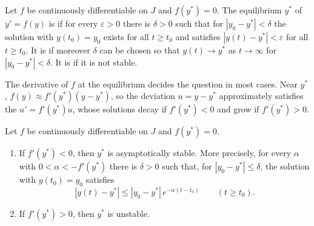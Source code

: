 \begin{definition}[Stability]
\label{def:stability}
Let $f$ be continuously differentiable on $J$ and $f(y^*)=0$. The equilibrium $y^*$ of $y'=f(y)$ is  if for every $\varepsilon>0$ there is $\delta>0$ such that for $|y_0-y^*|<\delta$ the solution with $y(t_0)=y_0$ exists for all $t\ge t_0$ and satisfies $|y(t)-y^*|<\varepsilon$ for all $t\ge t_0$. It is  if moreover $\delta$ can be chosen so that $y(t)\to y^*$ as $t\to\infty$ for $|y_0-y^*|<\delta$. It is  if it is not stable.
\end{definition}

The derivative of $f$ at the equilibrium decides the question in most cases. Near $y^*$, $f(y)\approx f'(y^*)(y-y^*)$, so the deviation $u=y-y^*$ approximately satisfies the  $u'=f'(y^*)u$, whose solutions decay if $f'(y^*)<0$ and grow if $f'(y^*)>0$.

\begin{theorem}
\label{thm:linearised-stability}
Let $f$ be continuously differentiable on $J$ and $f(y^*)=0$.
\begin{enumerate}
\item If $f'(y^*)<0$, then $y^*$ is asymptotically stable. More precisely, for every $\alpha$ with $0<\alpha<-f'(y^*)$ there is $\delta>0$ such that, for $|y_0-y^*|\le\delta$, the solution with $y(t_0)=y_0$ satisfies
\[
|y(t)-y^*|\le|y_0-y^*|\,e^{-\alpha(t-t_0)}\qquad(t\ge t_0).
\]
\item If $f'(y^*)>0$, then $y^*$ is unstable.
\end{enumerate}
\end{theorem}

